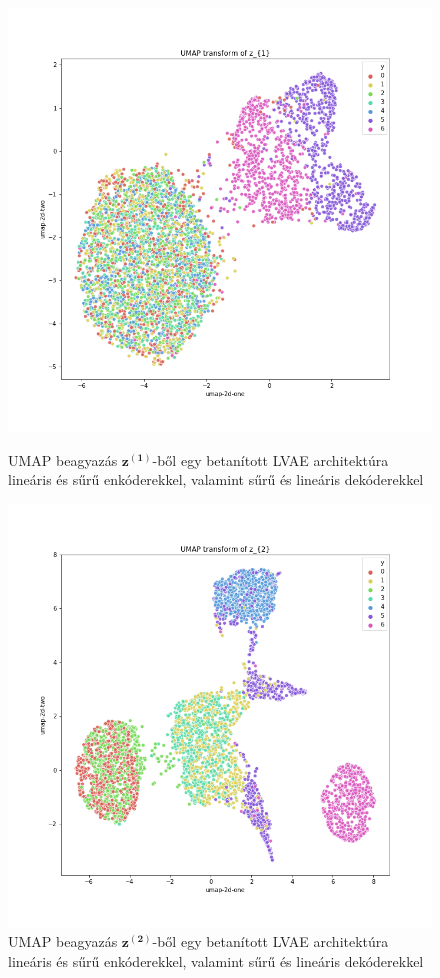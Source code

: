 \documentclass[12pt, english]{article}
\begin{document}
\begin{figure}[H] 
  \begin{minipage}{0.48\linewidth}
    \centering
    \includegraphics[width=.7\linewidth]{umap_z1_dense_lin_lin_no_norm.png}
    \caption{UMAP beagyazás $\bm{z^{(1)}}$-ből egy betanított LVAE architektúra lineáris és sűrű enkóderekkel, valamint sűrű és lineáris dekóderekkel}
    \label{fig:umap-z1}
  \end{minipage}\hfill
  \begin{minipage}{0.48\linewidth}
    \centering
    \includegraphics[width=.7\linewidth]{umap_z2_dense_lin_lin_no_norm.png} 
    \caption{UMAP beagyazás $\bm{z^{(2)}}$-ből egy betanított LVAE architektúra lineáris és sűrű enkóderekkel, valamint sűrű és lineáris dekóderekkel} 
    \label{fig:umap-z2}
  \end{minipage} 
\end{figure}
\end{document}
